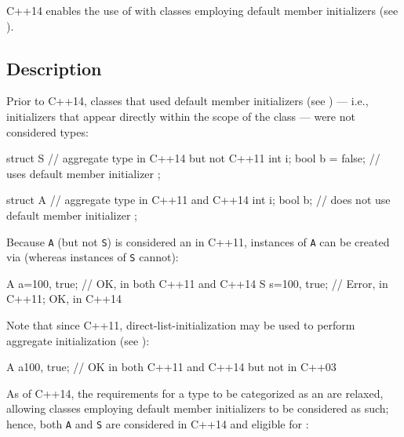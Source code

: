 

\setcounter{table}{0}
\setcounter{footnote}{0}
\setcounter{lstlisting}{0}


C++14 enables the use of  with classes
employing default member initializers (see ).

\subsection[Description]{Description}\label{description}

Prior to C++14, classes that used default member initializers (see ) --- i.e., initializers that appear directly within the
scope of the class --- were not considered  types:

\begin{emcppslisting}[emcppsbatch={e1,e2,e3}]
struct S                // aggregate type in C++14 but not C++11
{
    int i;
    bool b = false;     // uses default member initializer
};

struct A                // aggregate type in C++11 and C++14
{
    int  i;
    bool b;             // does not use default member initializer
};
\end{emcppslisting}

\noindent Because \lstinline!A! (but not \lstinline!S!) is considered an  in
C++11, instances of \lstinline!A! can be created via  (whereas instances of \lstinline!S! cannot):

\begin{emcppslisting}[emcppsbatch=e1]
A a={100, true};  // OK, in both C++11 and C++14
S s={100, true};  // Error, in C++11; OK, in C++14
\end{emcppslisting}


\noindent Note that since C++11, direct-list-initialization may be used to perform aggregate initialization (see ):
\begin{emcppslisting}[emcppsbatch=e2]
A a{100, true};  // OK in both C++11 and C++14 but not in C++03
\end{emcppslisting}
As of C++14, the requirements for a type to be categorized as an
 are relaxed, allowing classes employing default
member initializers to be considered as such; hence, both \lstinline!A! and
\lstinline!S! are considered  in C++14 and eligible for
:

